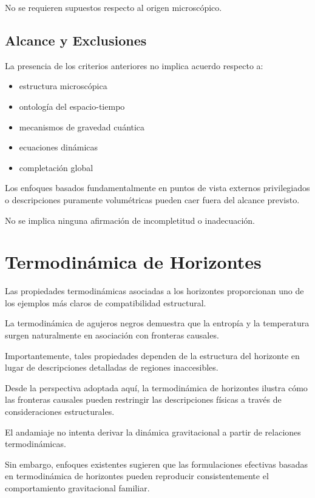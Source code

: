 \documentclass[12pt,a4paper]{article}
\begin{document}
No se requieren supuestos respecto al origen microscópico.

\subsection{Alcance y Exclusiones}

La presencia de los criterios anteriores no implica acuerdo respecto a:

\begin{itemize}
  \item estructura microscópica
  \item ontología del espacio-tiempo
  \item mecanismos de gravedad cuántica
  \item ecuaciones dinámicas
  \item completación global
\end{itemize}

Los enfoques basados fundamentalmente en puntos de vista externos privilegiados o descripciones puramente volumétricas pueden caer fuera del alcance previsto.

No se implica ninguna afirmación de incompletitud o inadecuación.

\section{Termodinámica de Horizontes}

Las propiedades termodinámicas asociadas a los horizontes proporcionan uno de los ejemplos más claros de compatibilidad estructural.

La termodinámica de agujeros negros demuestra que la entropía y la temperatura surgen naturalmente en asociación con fronteras causales.

Importantemente, tales propiedades dependen de la estructura del horizonte en lugar de descripciones detalladas de regiones inaccesibles.

Desde la perspectiva adoptada aquí, la termodinámica de horizontes ilustra cómo las fronteras causales pueden restringir las descripciones físicas a través de consideraciones estructurales.

El andamiaje no intenta derivar la dinámica gravitacional a partir de relaciones termodinámicas.

Sin embargo, enfoques existentes sugieren que las formulaciones efectivas basadas en termodinámica de horizontes pueden reproducir consistentemente el comportamiento gravitacional familiar.
\end{document}
